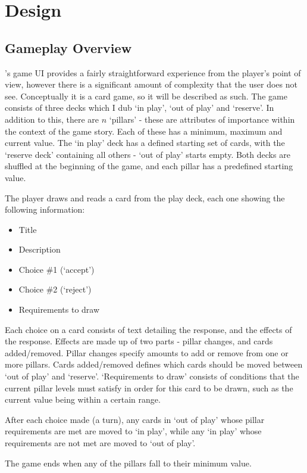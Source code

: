 \chapter{Design}

\section{Gameplay Overview}
\od{}'s game UI provides a fairly straightforward experience from the player's point of view, however there is a significant amount of complexity that the user does not see.
Conceptually it is a card game, so it will be described as such.
The game consists of three decks which I dub `in play', `out of play' and `reserve'. In addition to this, there are $n$ `pillars' - these are attributes of importance within the context of the game story. Each of these has a minimum, maximum and current value.
The `in play' deck has a defined starting set of cards, with the `reserve deck' containing all others - `out of play' starts empty.
Both decks are shuffled at the beginning of the game, and each pillar has a predefined starting value.

The player draws and reads a card from the play deck, each one showing the following information:

\begin{itemize}
	\item Title
	\item Description
	\item Choice \#1 (`accept')
	\item Choice \#2 (`reject')
	\item Requirements to draw
\end{itemize}
Each choice on a card consists of text detailing the response, and the effects of the response. Effects are made up of two parts - pillar changes, and cards added/removed. Pillar changes specify amounts to add or remove from one or more pillars. Cards added/removed defines which cards should be moved between `out of play' and `reserve'.
`Requirements to draw' consists of conditions that the current pillar levels must satisfy in order for this card to be drawn, such as the current value being within a certain range.

After each choice made (a turn), any cards in `out of play' whose pillar requirements are met are moved to `in play', while any `in play' whose requirements are not met are moved to `out of play'.

The game ends when any of the pillars fall to their minimum value.

